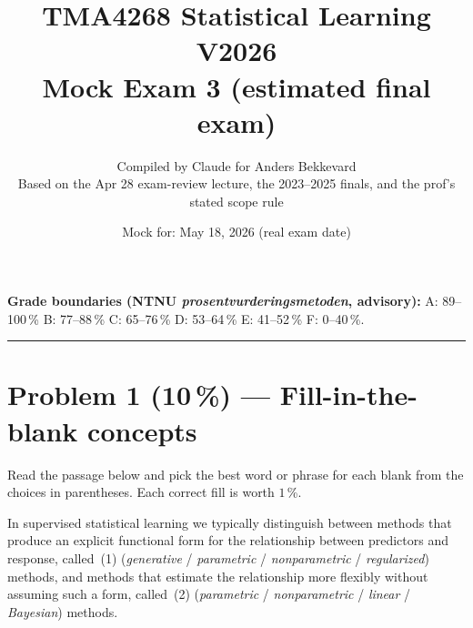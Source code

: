 \documentclass[11pt,a4paper]{article}
\title{TMA4268 Statistical Learning V2026\\[0.3em]
\large Mock Exam 3 (estimated final exam)}
\author{Compiled by Claude for Anders Bekkevard\\[0.2em]
\small Based on the Apr 28 exam-review lecture, the 2023--2025 finals, and the prof's stated scope rule}
\date{Mock for: May 18, 2026 (real exam date)}
\newcommand{\points}[1]{\textbf{(#1\,\%)}}
\begin{document}
\maketitle

\noindent{}

\vspace{0.6em}
\noindent\textbf{Grade boundaries (NTNU \emph{prosentvurderingsmetoden}, advisory):}
A: 89--100\,\% \quad B: 77--88\,\% \quad C: 65--76\,\% \quad D: 53--64\,\% \quad E: 41--52\,\% \quad F: 0--40\,\%.

\vspace{1em}
\hrule
\vspace{1em}

\section*{Problem 1 \points{10} --- Fill-in-the-blank concepts}

\noindent Read the passage below and pick the best word or phrase for each blank from the choices in parentheses. Each correct fill is worth $1$\,\%.

\bigskip

In supervised statistical learning we typically distinguish between methods that produce an explicit functional form for the relationship between predictors and response, called \underline{\hspace{2.5cm}}\,(1) (\emph{generative} / \emph{parametric} / \emph{nonparametric} / \emph{regularized}) methods, and methods that estimate the relationship more flexibly without assuming such a form, called \underline{\hspace{2.5cm}}\,(2) (\emph{parametric} / \emph{nonparametric} / \emph{linear} / \emph{Bayesian}) methods.
\end{document}
